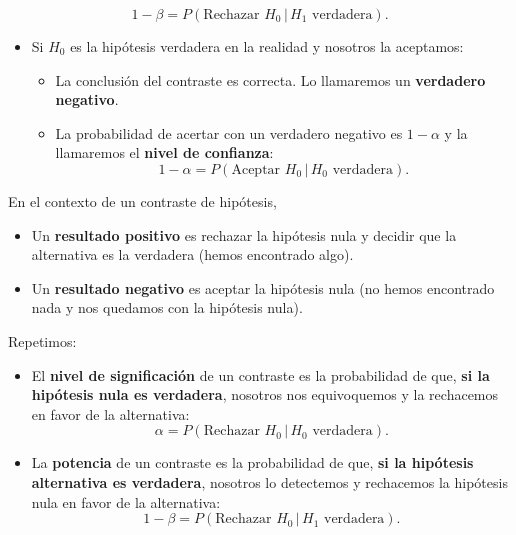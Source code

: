 \documentclass[
  spanish,
  letterpaper,
  DIV=11,
  numbers=noendperiod]{scrreprt}
\begin{document}
\[
1-\beta=P(\text{Rechazar } H_0\,|\, H_1\text{ verdadera}).
\]

\begin{itemize}
\item
  Si \(H_0\) es la hipótesis verdadera en la realidad y nosotros la
  aceptamos:

  \begin{itemize}
  \item
    La conclusión del contraste es correcta. Lo llamaremos un
    \textbf{verdadero negativo}.
  \item
    La probabilidad de acertar con un verdadero negativo es \(1-\alpha\)
    y la llamaremos el \textbf{nivel de confianza}: \[
    1-\alpha=P(\text{Aceptar } H_0\,|\, H_0\text{ verdadera}).
    \]
  \end{itemize}
\end{itemize}

\begin{tcolorbox}[enhanced jigsaw, arc=.35mm, bottomrule=.15mm, bottomtitle=1mm, breakable, colback=white, colbacktitle=quarto-callout-important-color!10!white, colframe=quarto-callout-important-color-frame, coltitle=black, left=2mm, leftrule=.75mm, opacityback=0, opacitybacktitle=0.6, rightrule=.15mm, title=\textcolor{quarto-callout-important-color}{\faExclamation}\hspace{0.5em}{Importante}, titlerule=0mm, toprule=.15mm, toptitle=1mm]

En el contexto de un contraste de hipótesis,

\begin{itemize}
\item
  Un \textbf{resultado positivo} es rechazar la hipótesis nula y decidir
  que la alternativa es la verdadera (hemos encontrado algo).
\item
  Un \textbf{resultado negativo} es aceptar la hipótesis nula (no hemos
  encontrado nada y nos quedamos con la hipótesis nula).
\end{itemize}

\end{tcolorbox}

Repetimos:

\begin{itemize}
\item
  El \textbf{nivel de significación} de un contraste es la probabilidad
  de que, \textbf{si la hipótesis nula es verdadera}, nosotros nos
  equivoquemos y la rechacemos en favor de la alternativa: \[
  \alpha=P(\text{Rechazar } H_0\,|\, H_0\text{ verdadera}).
  \]
\item
  La \textbf{potencia} de un contraste es la probabilidad de que,
  \textbf{si la hipótesis alternativa es verdadera}, nosotros lo
  detectemos y rechacemos la hipótesis nula en favor de la alternativa:
  \[
  1-\beta=P(\text{Rechazar } H_0\,|\, H_1\text{ verdadera}).
  \]
\end{itemize}
\end{document}
